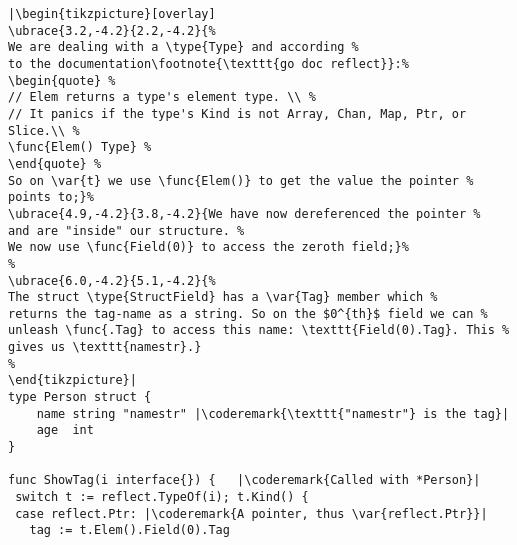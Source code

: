 \begin{lstlisting}[caption=Introspection using reflection,label=src:introspection]
|\begin{tikzpicture}[overlay]
\ubrace{3.2,-4.2}{2.2,-4.2}{%
We are dealing with a \type{Type} and according %
to the documentation\footnote{\texttt{go doc reflect}}:%
\begin{quote} %
// Elem returns a type's element type. \\ %
// It panics if the type's Kind is not Array, Chan, Map, Ptr, or Slice.\\ %
\func{Elem() Type} %
\end{quote} %
So on \var{t} we use \func{Elem()} to get the value the pointer %
points to;}%
\ubrace{4.9,-4.2}{3.8,-4.2}{We have now dereferenced the pointer %
and are "inside" our structure. %
We now use \func{Field(0)} to access the zeroth field;}%
%
\ubrace{6.0,-4.2}{5.1,-4.2}{%
The struct \type{StructField} has a \var{Tag} member which %
returns the tag-name as a string. So on the $0^{th}$ field we can %
unleash \func{.Tag} to access this name: \texttt{Field(0).Tag}. This %
gives us \texttt{namestr}.}
%
\end{tikzpicture}|
type Person struct {
    name string "namestr" |\coderemark{\texttt{"namestr"} is the tag}|
    age  int
}

func ShowTag(i interface{}) {   |\coderemark{Called with *Person}|
 switch t := reflect.TypeOf(i); t.Kind() {
 case reflect.Ptr: |\coderemark{A pointer, thus \var{reflect.Ptr}}|
   tag := t.Elem().Field(0).Tag
\end{lstlisting}
